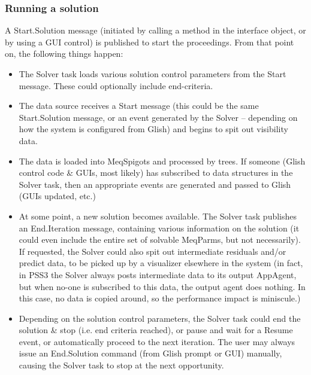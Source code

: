 \documentclass[12pt]{article}
\begin{document}
\subsubsection{Running a solution}

  A Start.Solution message (initiated by calling a method in the interface
  object, or by using a GUI control) is published to start the proceedings. From
  that point on, the following things happen:

  \begin{itemize}
  
  \item The Solver task loads various solution control parameters from the
  Start message. These could optionally include end-criteria.

  \item The data source receives a Start message (this could be the same
  Start.Solution message, or an event generated by the Solver -- depending on
  how the system is configured from Glish) and begins to spit out visibility 
  data.
  
  \item The data is loaded into MeqSpigots and processed by trees. If someone
  (Glish control code \& GUIs, most likely) has subscribed to data structures
  in the Solver task, then an appropriate events are generated and passed to
  Glish (GUIs updated, etc.)

  \item At some point, a new solution becomes available. The Solver task
  publishes an End.Iteration message, containing various information on the
  solution (it could even include the entire set of solvable MeqParms, but not
  necessarily). If requested, the Solver could also spit out intermediate
  residuals and/or predict data, to be picked up by a visualizer elsewhere in
  the system (in fact, in PSS3 the Solver always posts intermediate data to its
  output AppAgent, but when no-one is subscribed to this data, the output agent
  does nothing. In this case, no data is copied around, so the performance
  impact is miniscule.) 

  \item Depending on the solution control parameters, the Solver task could end
  the solution \& stop (i.e. end criteria reached), or pause and wait for a
  Resume event, or automatically proceed to the next iteration. The user may
  always issue an End.Solution command (from Glish prompt or GUI) manually,
  causing the Solver task to stop at the next opportunity. 


\end{itemize}
\end{document}
